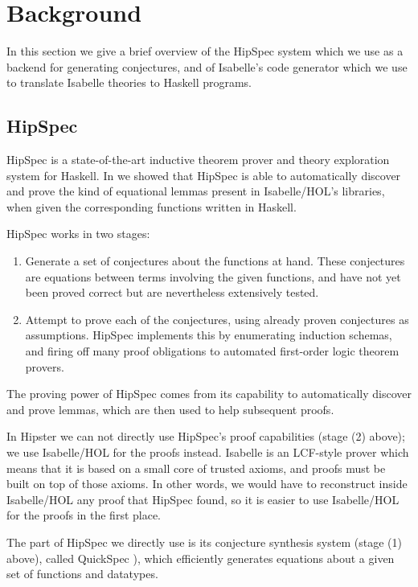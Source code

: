 \section{Background}
\label{sec:background}

In this section we give a brief overview of the HipSpec system which
we use as a backend for generating conjectures, and of Isabelle's code generator which we use to translate Isabelle theories to Haskell programs. 

\subsection{HipSpec}
HipSpec is a
state-of-the-art inductive theorem prover and theory exploration
system for Haskell. In \cite{hipspecCADE} we showed that HipSpec is
able to automatically discover and prove the kind of equational lemmas present in
Isabelle/HOL's libraries, when given the corresponding functions written in Haskell.

HipSpec works in two stages:
\begin{enumerate}
\item Generate a set of conjectures about the functions at hand. These
  conjectures are equations between terms involving the given
  functions, and have not yet been proved correct but are nevertheless
  extensively tested.

\item Attempt to prove each of the conjectures, using already proven conjectures as assumptions. HipSpec implements this by enumerating induction schemas, and firing off many proof obligations to automated first-order logic theorem provers.
\end{enumerate}
The proving power of HipSpec comes from its capability to
automatically discover and prove lemmas, which are then used to help
subsequent proofs.


In Hipster we can not directly use HipSpec's
proof capabilities (stage (2) above); we use Isabelle/HOL for the proofs instead. Isabelle  is an LCF-style prover which means that it
is based on a small core of trusted axioms, and proofs must be built
on top of those axioms. In other words, we would have to reconstruct
inside Isabelle/HOL any proof that HipSpec found, so it is easier
to use Isabelle/HOL for the proofs in the first place. 

The part of HipSpec we directly use
is its conjecture synthesis system (stage (1) above), called QuickSpec \cite{quickspec}),
which efficiently generates equations about a given set of functions and
datatypes.

